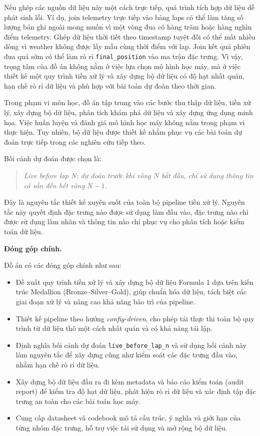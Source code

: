 \documentclass[conference]{IEEEtran}
\begin{document}
Nếu ghép các nguồn dữ liệu này một cách trực tiếp, quá trình tích hợp dữ liệu dễ phát sinh lỗi. Ví dụ, join telemetry trực tiếp vào bảng laps có thể làm tăng số lượng bản ghi ngoài mong muốn vì một vòng đua có hàng trăm hoặc hàng nghìn điểm telemetry. Ghép dữ liệu thời tiết theo timestamp tuyệt đối có thể mất nhiều dòng vì weather không được lấy mẫu cùng thời điểm với lap. Join kết quả phiên đua quá sớm có thể làm rò rỉ \texttt{final\_position} vào ma trận đặc trưng. Vì vậy, trọng tâm của đồ án không nằm ở việc lựa chọn mô hình học máy, mà ở việc thiết kế một quy trình tiền xử lý và xây dựng bộ dữ liệu có độ hạt nhất quán, hạn chế rò rỉ dữ liệu và phù hợp với bài toán dự đoán theo thời gian.

Trong phạm vi môn học, đồ án tập trung vào các bước thu thập dữ liệu, tiền xử lý, xây dựng bộ dữ liệu, phân tích khám phá dữ liệu và xây dựng ứng dụng minh họa. Việc huấn luyện và đánh giá mô hình học máy không nằm trong phạm vi thực hiện. Tuy nhiên, bộ dữ liệu được thiết kế nhằm phục vụ các bài toán dự đoán trực tiếp trong các nghiên cứu tiếp theo.

Bối cảnh dự đoán được chọn là:

\begin{quote}
\emph{Live before lap N: dự đoán trước khi vòng \(N\) bắt đầu, chỉ sử dụng thông tin có sẵn đến hết vòng \(N-1\).}
\end{quote}

Đây là nguyên tắc thiết kế xuyên suốt của toàn bộ pipeline tiền xử lý. Nguyên tắc này quyết định đặc trưng nào được sử dụng làm đầu vào, đặc trưng nào chỉ được sử dụng làm nhãn và thông tin nào chỉ phục vụ cho phân tích hoặc kiểm toán dữ liệu.

\textbf{Đóng góp chính.}

Đồ án có các đóng góp chính như sau:

\begin{itemize}
    \item Đề xuất quy trình tiền xử lý và xây dựng bộ dữ liệu Formula 1 dựa trên kiến trúc Medallion (Bronze--Silver--Gold), giúp chuẩn hóa dữ liệu, tách biệt các giai đoạn xử lý và nâng cao khả năng bảo trì của pipeline.

    \item Thiết kế pipeline theo hướng \emph{config-driven}, cho phép tái thực thi toàn bộ quy trình từ dữ liệu thô một cách nhất quán và có khả năng tái lập.

    \item Định nghĩa bối cảnh dự đoán \texttt{live\_before\_lap\_n} và sử dụng bối cảnh này làm nguyên tắc để xây dựng cũng như kiểm soát các đặc trưng đầu vào, nhằm hạn chế rò rỉ dữ liệu.

    \item Xây dựng bộ dữ liệu đầu ra đi kèm metadata và báo cáo kiểm toán (audit report) để kiểm tra độ hạt dữ liệu, phát hiện rò rỉ dữ liệu và xác định tập đặc trưng an toàn cho các bài toán học máy.

    \item Cung cấp datasheet và codebook mô tả cấu trúc, ý nghĩa và giới hạn của từng nhóm đặc trưng, hỗ trợ việc tái sử dụng và mở rộng bộ dữ liệu.
\end{itemize}
\end{document}
